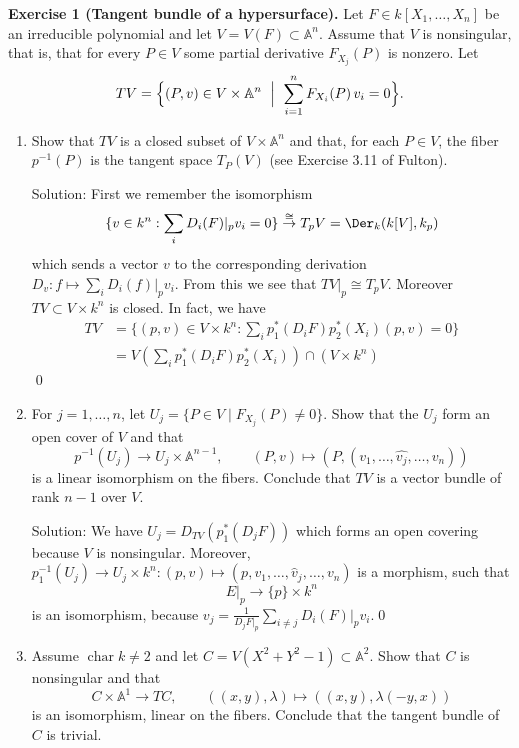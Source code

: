 \bigskip
\noindent\textbf{Exercise 1 (Tangent bundle of a hypersurface).} Let $F\in k[X_1,\dots,X_n]$ be an irreducible polynomial and let $V=V(F)\subset\mathbb{A}^n$. Assume that $V$ is nonsingular, that is, that for every $P\in V$ some partial derivative $F_{X_j}(P)$ is nonzero. Let
\[
TV=\Bigl\{(P,v)\in V\times\mathbb{A}^n\ \Bigm|\ \sum_{i=1}^{n}F_{X_i}(P)\,v_i=0\Bigr\}.
\]
\begin{enumerate}
\item[(a)] Show that $TV$ is a closed subset of $V\times\mathbb{A}^n$ and that, for 
each $P\in V$, the fiber $p^{-1}(P)$ is the tangent space $T_P(V)$ (see Exercise 3.11 of Fulton).\par 

Solution: First we remember the isomorphism 
\begin{equation}
    \{v\in k^n: \sum_i D_i(F)|_p v_i=0\} \overset{\cong}{\to}T_pV=\Der_k(k[V],k_p) 
\end{equation}
which sends a vector $v$ to the corresponding derivation $D_v:f\mapsto \sum_i D_i(f)|_p v_i$. From this we see that 
$TV|_p \cong T_pV$. Moreover $TV\subset V\times k^n$ is closed. In fact, we have 
\begin{equation}
    \begin{split}
        TV &=\{(p,v)\in V\times k^n: \sum_i p_1^*(D_i F)p_2^*(X_i)(p,v)=0\}\\
        &=V(\sum_ip_1^*(D_i F)p_2^*(X_i))\cap (V\times k^n)
    \end{split}
\end{equation}
\qed
\item[(b)] For $j=1,\dots,n$, let $U_j=\{P\in V\mid F_{X_j}(P)\neq 0\}$. 
Show that the $U_j$ form an open cover of $V$ and that
\[
p^{-1}(U_j)\to U_j\times\mathbb{A}^{n-1},\qquad (P,v)\mapsto(P,(v_1,\dots,\widehat{v_j},\dots,v_n))
\]
is a linear isomorphism on the fibers. Conclude that $TV$ is a vector bundle of rank $n-1$ over $V$.\par 

Solution: We have $U_j = D_{TV}(p_1^*(D_jF))$ which forms an open covering because $V$ is nonsingular. Moreover, 
$p_1^{-1}(U_j)\to U_j\times k^n:(p,v)\mapsto (p,v_1,\dots,\hat{v}_j,\dots,v_n)$ is a morphism, such that 
\begin{equation}
    E|_p \to \{p\}\times k^n 
\end{equation}
is an isomorphism, because $v_j=\tfrac{1}{D_jF|_p}\sum_{i\neq j}D_i(F)|_pv_i$.\qed


\item[(c)] Assume $\operatorname{char}k\neq 2$ and let $C=V(X^2+Y^2-1)\subset\mathbb{A}^2$.
 Show that $C$ is nonsingular and that
\[
C\times\mathbb{A}^1\to TC,\qquad ((x,y),\lambda)\mapsto((x,y),\lambda(-y,x))
\]
is an isomorphism, linear on the fibers. Conclude that the tangent bundle of $C$ is trivial.\par 


\end{enumerate}
